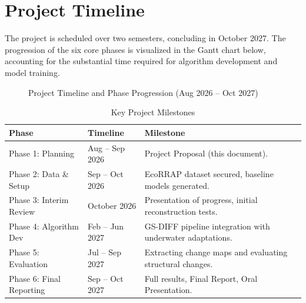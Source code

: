\chapter{Project Timeline}

The project is scheduled over two semesters, concluding in October 2027. The progression of the six core phases is visualized in the Gantt chart below, accounting for the substantial time required for algorithm development and model training.

\begin{figure}[H]
\centering
{}
\caption{Project Timeline and Phase Progression (Aug 2026 -- Oct 2027)}
\end{figure}

\begin{table}[H]
\centering
\caption{Key Project Milestones}
\begin{tabularx}{\textwidth}{l l X}
\toprule
\textbf{Phase} & \textbf{Timeline} & \textbf{Milestone} \\
\midrule
Phase 1: Planning & Aug -- Sep 2026 & Project Proposal (this document). \\
Phase 2: Data \& Setup & Sep -- Oct 2026 & EcoRRAP dataset secured, baseline models generated. \\
Phase 3: Interim Review & October 2026 & Presentation of progress, initial reconstruction tests. \\
Phase 4: Algorithm Dev & Feb -- Jun 2027 & GS-DIFF pipeline integration with underwater adaptations. \\
Phase 5: Evaluation & Jul -- Sep 2027 & Extracting change maps and evaluating structural changes. \\
Phase 6: Final Reporting & Sep -- Oct 2027 & Full results, Final Report, Oral Presentation. \\
\bottomrule
\end{tabularx}
\end{table}
